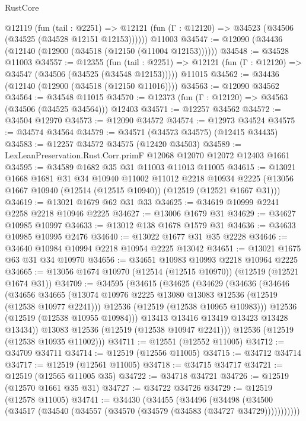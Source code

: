 \begin{lexlean}{RustCore}
\begin{coremodule}
    @12119
      (fun (tail : @2251) =>
      @12121 (fun (Γ : @12120) => @34523 (@34506 (@34525 (@34528 @12151 @12153))))))
    @11003
@34547 := @12090 (@34436 (@12140 (@12900 (@34518 (@12150 (@11004 @12153))))))
@34548 := @34528 @11003
@34557 := @12355
    (fun (tail : @2251) => @12121 (fun (Γ : @12120) => @34547 (@34506 (@34525 (@34548 @12153)))))
    @11015
@34562 := @34436 (@12140 (@12900 (@34518 (@12150 @11016))))
@34563 := @12090 @34562
@34564 := @34548 @11015
@34570 := @12373 (fun (Γ : @12120) => @34563 (@34506 (@34525 @34564))) @12403
@34571 := @12257 @34562
@34572 := @34504 @12970
@34573 := @12090 @34572
@34574 := @12973 @34524
@34575 := @34574 @34564
@34579 := @34571 (@34573 @34575) (@12415 @34435)
@34583 := @12257 @34572 @34575 (@12420 @34503)
@34589 := LexLeanPreservation.Rust.Corr.primF @12068 @12070 @12072 @12403 @1661
@34595 := @34589 @1682 @35 @31 @11003 @11013 @11005
@34615 := @13021
    @1668
    @1681
    @31
    @34
    @10940
    @11002
    @11012
    @2218
    @10934
    @2225
    (@13056 @1667 @10940 (@12514 (@12515 @10940)) (@12519 (@12521 @1667 @31)))
@34619 := @13021 @1679 @62 @31 @33
@34625 := @34619 @10999 @2241 @2258 @2218 @10946 @2225
@34627 := @13006 @1679 @31
@34629 := @34627 @10985 @10997
@34633 := @13012 @138 @1678 @1579 @31
@34636 := @34633 @10985 @10995 @2476
@34640 := @13022 @1677 @31 @35 @2228
@34646 := @34640 @10984 @10994 @2218 @10954 @2225 @13042
@34651 := @13021 @1675 @63 @31 @34 @10970
@34656 := @34651 @10983 @10993 @2218 @10964 @2225
@34665 := @13056 @1674 @10970 (@12514 (@12515 @10970)) (@12519 (@12521 @1674 @31))
@34709 := @34595
    (@34615
      (@34625
        (@34629
          (@34636
            (@34646
              (@34656
                @34665
                (@13074 @10976 @2225 @13080 @13083 @12536 (@12519 (@12538 @10977 @2241)))
                @12536
                (@12519 (@12538 @10965 @10983)))
              @12536
              (@12519 (@12538 @10955 @10984)))
            @13413
            @13416
            @13419
            @13423
            @13428
            @13434))
        @13083
        @12536
        (@12519 (@12538 @10947 @2241)))
      @12536
      (@12519 (@12538 @10935 @11002)))
@34711 := @12551 (@12552 @11005)
@34712 := @34709 @34711
@34714 := @12519 (@12556 @11005)
@34715 := @34712 @34714
@34717 := @12519 (@12561 @11005)
@34718 := @34715 @34717
@34721 := @12519 (@12565 @11005 @35)
@34722 := @34718 @34721
@34726 := @12519 (@12570 @1661 @35 @31)
@34727 := @34722 @34726
@34729 := @12519 (@12578 @11005)
@34741 := @34430
    (@34455
      (@34496
        (@34498 (@34500 (@34517 (@34540 (@34557 (@34570 (@34579 (@34583 (@34727 @34729)))))))))))

\end{coremodule}
\end{lexlean}
